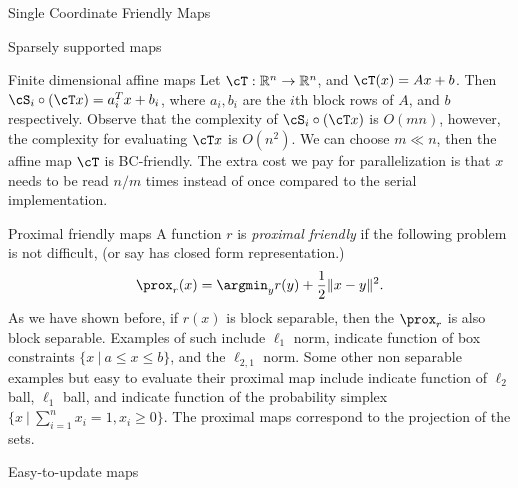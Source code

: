 \begin{section}{Single Coordinate Friendly Maps}
\begin{subsection}{Sparsely supported maps}
\begin{subsection}{Finite dimensional affine maps}
Let $\cT:\mathbb{R}^n \rightarrow \mathbb{R}^n $, and $\cT(x) = A x + b$. Then $\cS_i \circ (\cT x) = a_i^T x + b_i$, where $a_i, b_i$ are the $i$th block rows of $A$, and $b$ respectively. Observe that the complexity of $\cS_i \circ (\cT x)$ is $O(m n)$, however, the complexity for evaluating $\cT x$ is $O(n^2)$. We can choose $m \ll n$, then the affine map $\cT$ is BC-friendly. The extra cost we pay for parallelization is that $x$ needs to be read $n/m$ times instead of once compared to the serial implementation.
\end{subsection}



\end{subsection}

\begin{subsection}{Proximal friendly maps}
A function $r$ is \emph{proximal friendly} if the following problem  {\color{blue} is not difficult, (or say has closed form representation.)}
\begin{equation}
\prox_r(x) = \argmin_{y} r(y) + \frac{1}{2} \|x - y\|^2.
\end{equation}
As we have shown before, if $r(x)$ is block separable, then the $\prox_r$ is also block separable. Examples of such include $\ell_1$ norm, indicate function of box constraints $\{x ~|~ a \leq x \leq b\}$, and the $\ell_{2,1}$ norm. Some other non separable examples but easy to evaluate their proximal map include indicate function of $\ell_2$ ball, $\ell_1$ ball, and indicate function of the probability simplex $\{x~|~ \sum_{i=1}^n x_i = 1, x_i \geq 0\}$. The proximal maps correspond to the projection of the sets. 



\end{subsection}

\begin{subsection}{Easy-to-update maps}

\end{subsection}


\end{section}

